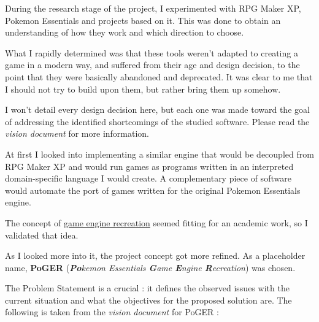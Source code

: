 \documentclass[11pt]{article}
\begin{document}
During the research stage of the project, I experimented with RPG Maker XP, Pokemon Essentials and projects based on it. This was done to obtain an understanding of how they work and which direction to choose.

What I rapidly determined was that these tools weren't adapted to creating a game in a modern way, and suffered from their age and design decision, to the point that they were basically abandoned and deprecated. It was clear to me that I should not try to build upon them, but rather bring them up somehow.

I won't detail every design decision here, but each one was made toward the goal of addressing the identified shortcomings of the studied software. Please read the \textit{vision document} for more information.

At first I looked into implementing a similar engine that would be decoupled from RPG Maker XP  and would run games as programs written in an interpreted domain-specific language I would create. A complementary piece of software would automate the port of games written for the original Pokemon Essentials engine.

The concept of \href{https://en.wikipedia.org/wiki/Game_engine_recreation}{game engine recreation} seemed fitting for an academic work, so I validated that idea. 

As I looked more into it, the project concept got more refined. As a placeholder name, \textbf{PoGER} (\textit{\textbf{Po}kemon Essentials \textbf{G}ame \textbf{E}ngine \textbf{R}ecreation}) was chosen.


The Problem Statement is a crucial : it defines the observed issues with the current situation and what the objectives for the proposed solution are. The following is taken from the \textit{vision document} for PoGER :
\end{document}
